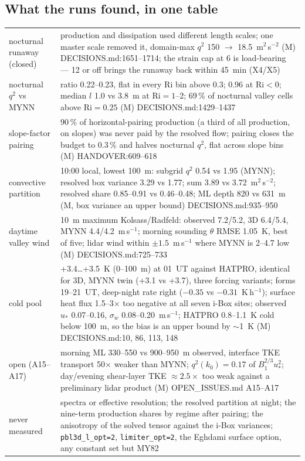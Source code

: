\documentclass[10pt,a4paper]{article}
\newcommand{\qsq}{q^2}
\newcommand{\Ri}{\mathrm{Ri}}
\newcommand{\src}[1]{{\scriptsize\textcolor{black!60}{#1}}}
\begin{document}
\subsection*{What the runs found, in one table}
\begin{small}
\begin{tabular}{@{}p{3.6cm}p{12.9cm}@{}}
\toprule
nocturnal runaway (closed) & production and dissipation used different length scales; one master scale removed it, domain-max $\qsq$ 150 $\to$ 18.5~m$^2$\,s$^{-2}$ (M) \src{DECISIONS.md:1651--1714}; the strain cap at 6 is load-bearing --- 12 or off brings the runaway back within 45~min (X4/X5) \\
nocturnal $\qsq$ vs MYNN & ratio 0.22--0.23, flat in every $\Ri$ bin above 0.3; 0.96 at $\Ri < 0$; median $l$ 1.0 vs 3.8~m at $\Ri = 1$--2; 69\,\% of nocturnal valley cells above $\Ri = 0.25$ (M) \src{DECISIONS.md:1429--1437} \\
slope-factor pairing & 90\,\% of horizontal-pairing production (a third of all production, on slopes) was never paid by the resolved flow; pairing closes the budget to 0.3\,\% and halves nocturnal $\qsq$, flat across slope bins (M) \src{HANDOVER:609--618} \\
convective partition & 10:00 local, lowest 100~m: subgrid $\qsq$ 0.54 vs 1.95 (MYNN); resolved box variance 3.29 vs 1.77; sum 3.89 vs 3.72~m$^2$\,s$^{-2}$; resolved share 0.85--0.91 vs 0.46--0.48; ML depth 820 vs 631~m (M, box variance an upper bound) \src{DECISIONS.md:935--950} \\
daytime valley wind & 10~m maximum Kolsass/Radfeld: observed 7.2/5.2, 3D 6.4/5.4, MYNN 4.4/4.2~m\,s$^{-1}$; morning sounding $\theta$ RMSE 1.05~K, best of five; lidar wind within $\pm 1.5$~m\,s$^{-1}$ where MYNN is 2--4.7 low (M) \src{DECISIONS.md:725--733} \\
cold pool & +3.4…+3.5~K (0--100~m) at 01~UT against HATPRO, identical for 3D, MYNN twin (+3.1 vs +3.7), three forcing variants; forms 19--21~UT, deep-night rate right ($-0.35$ vs $-0.31$~K\,h$^{-1}$); surface heat flux 1.5--3$\times$ too negative at all seven i-Box sites; observed $u_*$ 0.07--0.16, $\sigma_w$ 0.08--0.20~m\,s$^{-1}$; HATPRO 0.8--1.1~K cold below 100~m, so the bias is an upper bound by $\sim$1~K (M) \src{DECISIONS.md:10, 86, 113, 148} \\
open (A15--A17) & morning ML 330--550 vs 900--950~m observed, interface TKE transport 50$\times$ weaker than MYNN; $\qsq(k_0) = 0.17$ of $B_1^{2/3}u_*^2$; day/evening shear-layer TKE $\approx 2.5\times$ too weak against a preliminary lidar product (M) \src{OPEN\_ISSUES.md A15--A17} \\
never measured & spectra or effective resolution; the resolved partition at night; the nine-term production shares by regime after pairing; the anisotropy of the solved tensor against the i-Box variances; \texttt{pbl3d\_l\_opt=2}, \texttt{limiter\_opt=2}, the Eghdami surface option, any constant set but MY82 \\
\bottomrule
\end{tabular}
\end{small}
\end{document}
